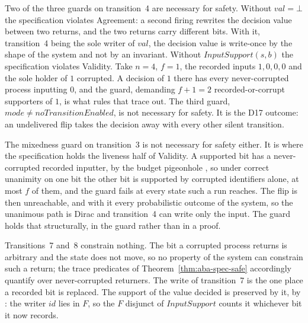 \medskip
\noindent Two of the three guards on transition~4 are necessary for safety.
Without $val = \bot$ the specification violates Agreement: a second firing rewrites the decision value between two returns, and the two returns carry different bits.
With it, transition~4 being the sole writer of $val$, the decision value is write-once by the shape of the system and not by an invariant.
Without $InputSupport(s,b)$ the specification violates Validity.
Take $n = 4$, $f = 1$, the recorded inputs $1,0,0,0$ and the sole holder of $1$ corrupted.
A decision of $1$ there has every never-corrupted process inputting $0$, and the guard, demanding $f + 1 = 2$ recorded-or-corrupt supporters of $1$, is what rules that trace out.
The third guard, $mode \neq noTransitionEnabled$, is not necessary for safety.
It is the D17 outcome: an undelivered flip takes the decision away with every other silent transition.

\noindent The mixedness guard on transition~3 is not necessary for safety either.
It is where the specification holds the liveness half of Validity.
A supported bit has a never-corrupted recorded inputter, by the budget pigeonhole , so under correct unanimity on one bit the other bit is supported by corrupted identifiers alone, at most $f$ of them, and the guard fails at every state such a run reaches.
The flip is then unreachable, and with it every probabilistic outcome of the system, so the unanimous path is Dirac and transition~4 can write only the input.
The guard holds that structurally, in the guard rather than in a proof.

\noindent Transitions~7 and~8 constrain nothing.
The bit a corrupted process returns is arbitrary and the state does not move, so no property of the system can constrain such a return; the trace predicates of Theorem~\ref{thm:aba-spec-safe} accordingly quantify over never-corrupted returners.
The write of transition~7 is the one place a recorded bit is replaced.
The support of the value decided is preserved by it, by : the writer $id$ lies in $F$, so the $F$ disjunct of $InputSupport$ counts it whichever bit it now records.

